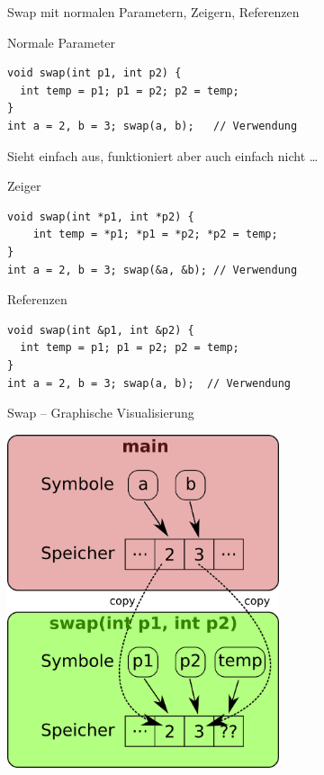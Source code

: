 \documentclass[presentation]{beamer}
\begin{document}
\begin{frame}[label={sec:org2e2c8f6},fragile]{Swap mit normalen Parametern, Zeigern, Referenzen}
 \begin{block}{Normale Parameter}
\begin{verbatim}
void swap(int p1, int p2) {
  int temp = p1; p1 = p2; p2 = temp;
}
int a = 2, b = 3; swap(a, b);   // Verwendung
\end{verbatim}
\footnotesize
Sieht einfach aus, funktioniert aber auch einfach nicht \ldots{}
\end{block}
\begin{block}{Zeiger}
\begin{verbatim}
void swap(int *p1, int *p2) {
    int temp = *p1; *p1 = *p2; *p2 = temp;
}
int a = 2, b = 3; swap(&a, &b); // Verwendung
\end{verbatim}
\end{block}
\begin{block}{Referenzen}
\begin{verbatim}
void swap(int &p1, int &p2) {
  int temp = p1; p1 = p2; p2 = temp;
}
int a = 2, b = 3; swap(a, b);  // Verwendung
\end{verbatim}
\end{block}
\end{frame}
\begin{frame}[label={sec:orga988b39}]{Swap -- Graphische Visualisierung}
\begin{center}
\includegraphics[width=0.6\textwidth]{img/swap_copy.png}
\end{center}
\end{frame}
\end{document}
